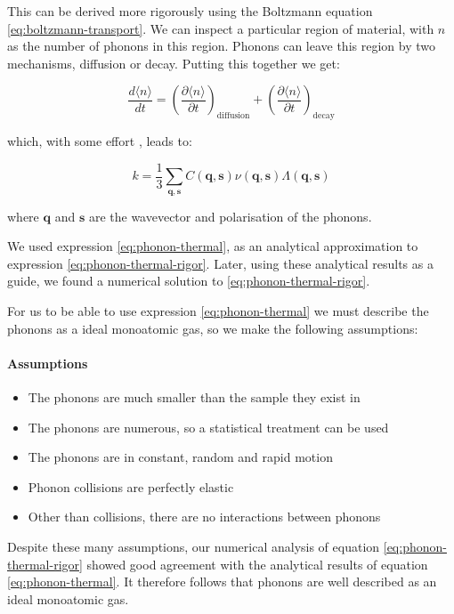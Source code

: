 \documentclass[12pt]{article}
\renewcommand{\vec}[1]{\mathbf{#1}}
\begin{document}
This can be derived more rigorously using the Boltzmann equation \eqref{eq:boltzmann-transport}. We can inspect a particular region of material, with $n$ as the number of phonons in this region. Phonons can leave this region by two mechanisms, diffusion or decay. Putting this together we get:

\begin{equation}
\label{eq:boltz-phonon-thermal}
	\frac{d \langle n \rangle}{dt} = \left(\frac{\partial \langle n \rangle}{\partial t}\right)_\mathrm{diffusion} + \left(\frac{\partial \langle n \rangle}{\partial t}\right)_\mathrm{decay}
\end{equation}

which, with some effort \cite{gp}, leads to:

\begin{equation}
\label{eq:phonon-thermal-rigor}
	k = \frac{1}{3} \sum_{\vec{q}, \vec{s}} C (\vec{q}, \vec{s}) \nu (\vec{q}, \vec{s}) \Lambda (\vec{q}, \vec{s})
\end{equation}

where $\vec{q}$ and $\vec{s}$ are the wavevector and polarisation of the phonons.

We used expression \eqref{eq:phonon-thermal}, as an analytical approximation to expression \eqref{eq:phonon-thermal-rigor}. Later, using these analytical results as a guide, we found a numerical solution to \eqref{eq:phonon-thermal-rigor}.

For us to be able to use expression \eqref{eq:phonon-thermal} we must describe the phonons as a ideal monoatomic gas, so we make the following assumptions:
\paragraph{Assumptions}
\begin{itemize}
  \item The phonons are much smaller than the sample they exist in
  \item The phonons are numerous, so a statistical treatment can be used
  \item The phonons are in constant, random and rapid motion
  \item Phonon collisions are perfectly elastic
  \item Other than collisions, there are no interactions between phonons
\end{itemize}

Despite these many assumptions, our numerical analysis of equation \eqref{eq:phonon-thermal-rigor} showed good agreement with the analytical results of equation \eqref{eq:phonon-thermal}. It therefore follows that phonons are well described as an ideal monoatomic gas.
\end{document}
